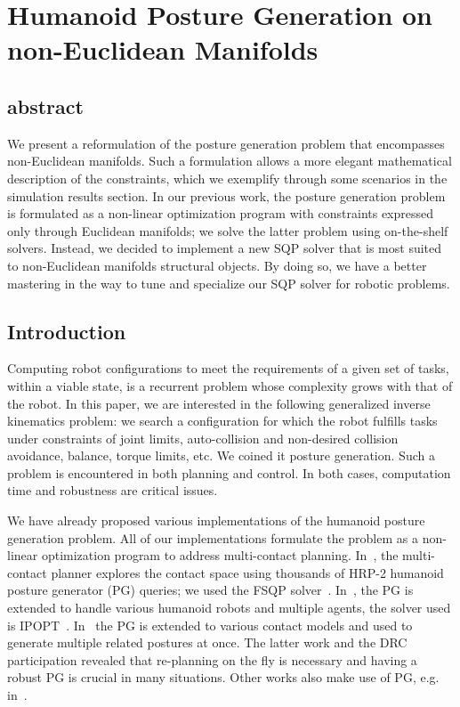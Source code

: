 \chapter{Humanoid Posture Generation on non-Euclidean Manifolds}

\section{abstract}
We present a reformulation of the posture generation problem that encompasses non-Euclidean manifolds. 
Such a formulation allows a more elegant mathematical description of the constraints, which we exemplify through some scenarios in the simulation results section.
In our previous work, the posture generation problem is formulated as a non-linear optimization program with constraints expressed only through Euclidean manifolds; we solve the latter problem using on-the-shelf solvers.
Instead, we decided to implement a new SQP solver that is most suited to non-Euclidean manifolds structural objects.
By doing so, we have a better mastering in the way to tune and specialize our SQP solver for robotic problems.


\section{Introduction}
\label{sec:Intro}
Computing robot configurations to meet the requirements of a given set of tasks, within a viable state, is a recurrent problem whose complexity grows with that of the robot. In this paper, we are interested in the following generalized inverse kinematics problem: we search a configuration for which the robot fulfills tasks under constraints of joint limits, auto-collision and non-desired collision avoidance, balance, torque limits, etc. We coined it posture generation. Such a problem is encountered in both planning and control. In both cases, computation time and robustness are critical issues.

We have already proposed various implementations of the humanoid posture generation problem. All of our implementations formulate the problem as a non-linear optimization program to address multi-contact planning. In~\cite{escande:ras:2013}, the multi-contact planner explores the contact space using thousands of HRP-2 humanoid posture generator (PG) queries; we used the FSQP solver~\cite{cfsqp:manual}. In~\cite{bouyarmane:ar:2012}, the PG is extended to handle various humanoid robots and multiple agents, the solver used is IPOPT~\cite{wachter:mp:2006}. In~\cite{vaillant:humanoids:2014} the PG is extended to various contact models and used to generate multiple related postures at once. The latter work and the DRC participation revealed that re-planning on the fly is necessary and having a robust PG is crucial in many situations. Other works also make use of PG, e.g. in~\cite{hauser:humanoids:2005}\cite{Aristidou2009}.

